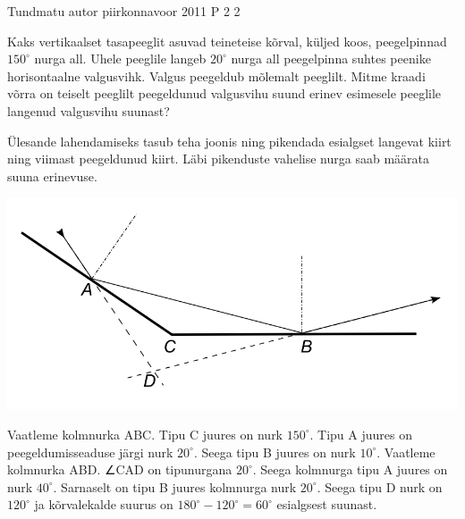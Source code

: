 {Tundmatu autor} %
{piirkonnavoor} %
{2011} %
{P 2} %
{2} %
{
\ifStatement
Kaks vertikaalset tasapeeglit asuvad teineteise kõrval, küljed koos, peegelpinnad
$150^{\circ}$ nurga all. Uhele peeglile langeb $20^{\circ}$ nurga all peegelpinna suhtes peenike horisontaalne valgusvihk. Valgus peegeldub mõlemalt peeglilt. Mitme kraadi võrra on teiselt peeglilt peegeldunud valgusvihu suund erinev esimesele peeglile langenud valgusvihu suunast?
\fi

\ifHint
Ülesande lahendamiseks tasub teha joonis ning pikendada esialgset langevat kiirt ning viimast peegeldunud kiirt. Läbi pikenduste vahelise nurga saab määrata suuna erinevuse.
\fi


\ifSolution
\begin{center}
	\includegraphics[width=0.5\linewidth]{2011-v2p-02-lah.PNG}
\end{center}
Vaatleme kolmnurka ABC. Tipu C juures on nurk $150^{\circ}$. Tipu A juures on peegeldumisseaduse järgi nurk $20^{\circ}$. Seega tipu B juures on nurk $10^{\circ}$. Vaatleme kolmnurka ABD. ∠CAD on tipunurgana $20^{\circ}$. Seega kolmnurga tipu A juures on nurk $40^{\circ}$. Sarnaselt on tipu B juures kolmnurga nurk $20^{\circ}$. Seega tipu D nurk on $120^{\circ}$ ja kõrvalekalde suurus on $180^{\circ} - 120^{\circ} = 60^{\circ}$ esialgsest suunast.
\fi
}
